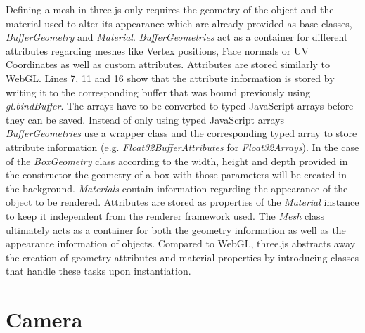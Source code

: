 Defining a mesh in three.js only requires the geometry of the object and the material used to alter its appearance which are already provided as base classes, \textit{BufferGeometry} and \textit{Material}. \textit{BufferGeometries} act as a container for different attributes regarding meshes like Vertex positions, Face normals or UV Coordinates as well as custom attributes. Attributes are stored similarly to WebGL. Lines 7, 11 and 16 show that the attribute information is stored by writing it to the corresponding buffer that was bound previously using \textit{gl.bindBuffer}. The arrays have to be converted to typed JavaScript arrays before they can be saved. Instead of only using typed JavaScript arrays \textit{BufferGeometries} use a wrapper class and the corresponding typed array to store attribute information (e.g. \textit{Float32BufferAttributes} for \textit{Float32Arrays}). In the case of the \textit{BoxGeometry} class according to the width, height and depth provided in the constructor the geometry of a box with those parameters will be created in the background. \textit{Materials} contain information regarding the appearance of the object to be rendered. Attributes are stored as properties of the \textit{Material} instance to keep it independent from the renderer framework used. The \textit{Mesh} class ultimately acts as a container for both the geometry information as well as the appearance information of objects. Compared to WebGL, three.js abstracts away the creation of geometry attributes and material properties by introducing classes that handle these tasks upon instantiation.

\section{Camera}
\label{sec:visualconcepts:camera}

